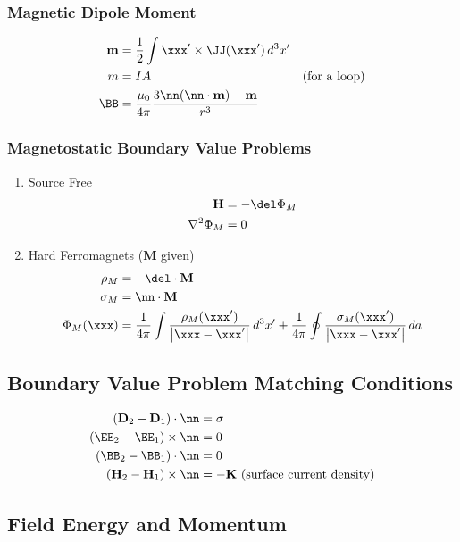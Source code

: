 \documentclass[11pt]{article}
\renewcommand{\HH}{\mathbf{H}}
\newcommand{\DD}{\mathbf{D}}
\newcommand{\MM}{\mathbf{M}}
\newcommand{\mm}{\mathbf{m}}
\begin{document}
\subsubsection{Magnetic Dipole Moment}
\label{sec:org2747667}
\begin{align*}
\mm & = \frac{1}{2} \int \xxx' \times \JJ(\xxx') \, d^3 x' \\
m & = I A & \mbox{(for a loop)} \\
\BB & = \frac{\mu_0}{4\pi} \frac{3\nn (\nn \cdot \mm) - \mm}{r^3}
\end{align*}
\subsubsection{Magnetostatic Boundary Value Problems}
\label{sec:org0af2580}
\begin{enumerate}
\item Source Free
\label{sec:orgfe3763b}
\begin{align*}
\HH & = -\del \Phi_M \\
\nabla^2 \Phi_M & = 0
\end{align*}
\item Hard Ferromagnets (\(\MM\) given)
\label{sec:orgb82d8be}
\begin{align*}
\rho_M & = -\del \cdot \MM \\
\sigma_M & = \nn \cdot \MM \\
\Phi_M(\xxx) & = \frac{1}{4\pi} \int \frac{\rho_M(\xxx')}{\left| \xxx - \xxx' \right|} \, d^3 x'
               + \frac{1}{4\pi} \oint \frac{\sigma_M(\xxx')}{\left| \xxx - \xxx' \right|} \, da
\end{align*}
\end{enumerate}
\subsection{Boundary Value Problem Matching Conditions}
\label{sec:org9195481}
\begin{align*}
(\DD_2 - \DD_1) \cdot \nn & = \sigma \\
(\EE_2 - \EE_1) \times \nn & = 0 \\
(\BB_2 - \BB_1) \cdot \nn & = 0 \\
(\HH_2 - \HH_1) \times \nn & = -\mathbf{K} \mbox{ (surface current density)}
\end{align*}
\subsection{Field Energy and Momentum}
\label{sec:org42b66e4}
\end{document}
